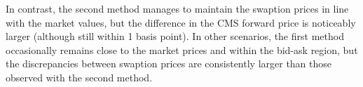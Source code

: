 In contrast, the second method manages to maintain the swaption prices in line with the market values, 
but the difference in the CMS forward price is noticeably larger (although still within 1 basis point). 
In other scenarios, the first method occasionally remains close to the market prices and within the bid-ask region, 
but the discrepancies between swaption prices are consistently larger than those observed with the second method.
















\begin{comment}
    \chapter{Results and variations}
This section provides an overview of the numerical outcomes generated by the methods we have introduced. We commence with a straightforward illustration from the example outlined in paper \cite{mission}, where in the focus lies on elucidating the process of designing neural network structures and selecting hyperparameters. In the subsequent example, we extend this algorithm to a specific interest rate product under more intricate conditions, subsequently comparing the outcomes with benchmark methods. Lastly, we propose a more generalized model and show its results.

\section{Application on 1D vanilla American put option}
Let's consider American options within the framework of the Black-Scholes Model. The price of this asset adheres to the dynamic described by $X_{t}=S_{t}$: $$dS_{t}=rS_{t}dt+\sigma S_{t}dW_{t}.$$ and the discounted factor is $\beta_{t}=\exp(rt)$. Consequently, the core formula for this scenario can be simplified to 
$$ \frac{V_{t_{i+1}}}{\beta_{\Delta t}} \approx 
        \Phi_{t_{i}}(S_{t_{i}})+
        \beta_{t_{i}}(\Psi_{t_{i}}(S_{t_{i}})\Delta W_{t_{i}} + \sigma \Psi^{'}_{t_{i}}(S_{t_{i}})(\frac{\Delta W_{t_{i}}^{2}-\Delta t}{2}))$$

In the first example, we assess the pricing of a one-dimensional (1D) vanilla American put option. This option matures at $T = 1$ and holds a strike price of $K = 40$, with an initial price of $S_{0} = 36$. The associated parameters include a risk-free rate, $r = 0.06$, and a volatility factor, $\sigma = 0.2$. The payoff function at time $t$ is represented as $Z(S_{t},K) = (K-S_{t})^{+}$.


\end{comment}
